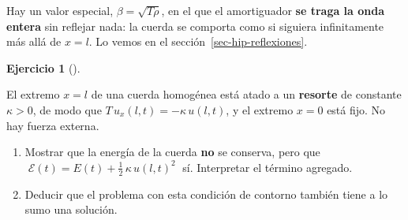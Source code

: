\documentclass[
  spanish,
  a4paper,
]{scrbook}
\theoremstyle{definition}
\theoremstyle{plain}
\theoremstyle{definition}
\theoremstyle{plain}
\theoremstyle{definition}
\newtheorem{exercise}{Ejercicio}[chapter]
\theoremstyle{remark}
\begin{document}
Hay un valor especial, \(\beta = \sqrt{T\rho}\), en el que el
amortiguador \textbf{se traga la onda entera} sin reflejar nada: la
cuerda se comporta como si siguiera infinitamente más allá de \(x=l\).
Lo vemos en el sección~\ref{sec-hip-reflexiones}.

\begin{exercise}[]\protect\hypertarget{exr-hip-robin}{}\label{exr-hip-robin}

El extremo \(x=l\) de una cuerda homogénea está atado a un
\textbf{resorte} de constante \(\kappa>0\), de modo que
\(T\,u_x(l,t) = -\kappa\,u(l,t)\), y el extremo \(x=0\) está fijo. No
hay fuerza externa.

\begin{enumerate}
\def\labelenumi{\alph{enumi})}
\item
  Mostrar que la energía de la cuerda \textbf{no} se conserva, pero que
  \(\;\mathcal E(t) = E(t) + \tfrac12\,\kappa\,u(l,t)^2\;\) sí.
  Interpretar el término agregado.
\item
  Deducir que el problema con esta condición de contorno también tiene a
  lo sumo una solución.
\end{enumerate}

\end{exercise}
\end{document}
